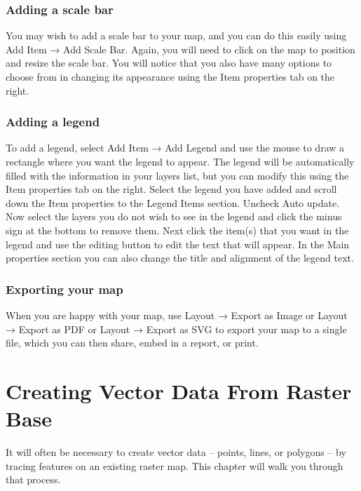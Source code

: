 \documentclass[]{book}
\begin{document}
\hypertarget{adding-a-scale-bar}{%
\subsection{Adding a scale bar}\label{adding-a-scale-bar}}

You may wish to add a scale bar to your map, and you can do this easily using Add Item → Add Scale Bar. Again, you will need to click on the map to position and resize the scale bar. You will notice that you also have many options to choose from in changing its appearance using the Item properties tab on the right.

\hypertarget{adding-a-legend}{%
\subsection{Adding a legend}\label{adding-a-legend}}

To add a legend, select Add Item → Add Legend and use the mouse to draw a rectangle where you want the legend to appear. The legend will be automatically filled with the information in your layers list, but you can modify this using the Item properties tab on the right. Select the legend you have added and scroll down the Item properties to the Legend Items section. Uncheck Auto update. Now select the layers you do not wish to see in the legend and click the minus sign at the bottom to remove them. Next click the item(s) that you want in the legend and use the editing button to edit the text that will appear. In the Main properties section you can also change the title and alignment of the legend text.

\hypertarget{exporting-your-map}{%
\subsection{Exporting your map}\label{exporting-your-map}}

When you are happy with your map, use Layout → Export as Image or Layout → Export as PDF or Layout → Export as SVG to export your map to a single file, which you can then share, embed in a report, or print.

\hypertarget{vector-from-raster}{%
\chapter{Creating Vector Data From Raster Base}\label{vector-from-raster}}

It will often be necessary to create vector data -- points, lines, or polygons -- by tracing features on an existing raster map. This chapter will walk you through that process.
\end{document}
